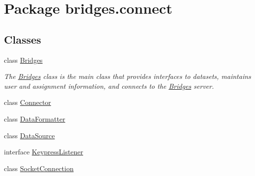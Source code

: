 \hypertarget{namespacebridges_1_1connect}{}\section{Package bridges.\+connect}
\label{namespacebridges_1_1connect}
\subsection*{Classes}
\begin{DoxyCompactItemize}
\item 
class \hyperlink{classbridges_1_1connect_1_1_bridges}{Bridges}
\begin{DoxyCompactList}\small\item\em The \hyperlink{classbridges_1_1connect_1_1_bridges}{Bridges} class is the main class that provides interfaces to datasets, maintains user and assignment information, and connects to the \hyperlink{classbridges_1_1connect_1_1_bridges}{Bridges} server. \end{DoxyCompactList}\item 
class \hyperlink{classbridges_1_1connect_1_1_connector}{Connector}
\item 
class \hyperlink{classbridges_1_1connect_1_1_data_formatter}{Data\+Formatter}
\item 
class \hyperlink{classbridges_1_1connect_1_1_data_source}{Data\+Source}
\item 
interface \hyperlink{interfacebridges_1_1connect_1_1_keypress_listener}{Keypress\+Listener}
\item 
class \hyperlink{classbridges_1_1connect_1_1_socket_connection}{Socket\+Connection}
\end{DoxyCompactItemize}
